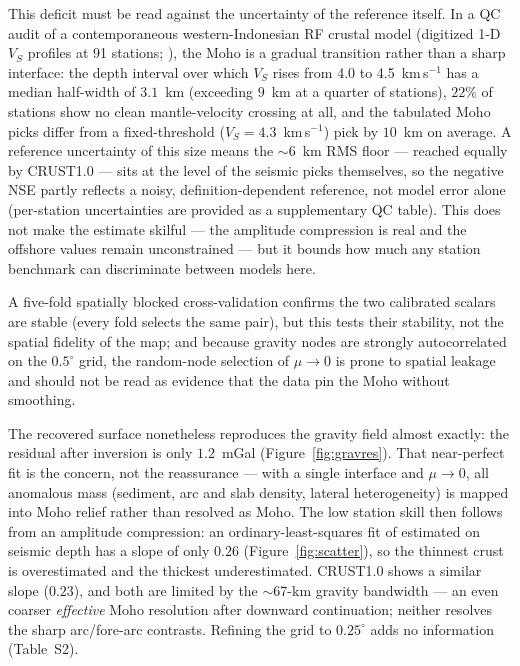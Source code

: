 \documentclass{agujournal2019}
\begin{document}
This deficit must be read against the uncertainty of the reference itself. In a QC
audit of a contemporaneous western-Indonesian RF crustal model (digitized 1-D $V_S$
profiles at 91 stations; \citealt{bahri2021}), the Moho is a gradual transition
rather than a sharp interface: the depth interval over which $V_S$ rises from 4.0 to
4.5~km\,s$^{-1}$ has a median half-width of $3.1$~km (exceeding $9$~km at a quarter of
stations), $22\%$ of stations show no clean mantle-velocity crossing at all, and the
tabulated Moho picks differ from a fixed-threshold ($V_S=4.3$~km\,s$^{-1}$) pick by
$10$~km on average. A reference uncertainty of this size means the $\sim$6~km RMS
floor --- reached equally by CRUST1.0 --- sits at the level of the seismic picks
themselves, so the negative NSE partly reflects a noisy, definition-dependent
reference, not model error alone (per-station uncertainties are provided as a
supplementary QC table). This does not make the estimate skilful --- the amplitude
compression is real and the offshore values remain unconstrained --- but it bounds
how much any station benchmark can discriminate between models here.

A five-fold spatially blocked cross-validation confirms the two
calibrated scalars are stable (every fold selects the same pair), but this tests
their stability, not the spatial fidelity of the map; and because gravity nodes are
strongly autocorrelated on the $0.5^{\circ}$ grid, the random-node selection of
$\mu\to0$ is prone to spatial leakage and should not be read as evidence that the
data pin the Moho without smoothing.

The recovered surface nonetheless reproduces the gravity field almost exactly: the
residual after inversion is only $1.2$~mGal (Figure~\ref{fig:gravres}). That
near-perfect fit is the concern, not the reassurance --- with a single interface and
$\mu\to0$, all anomalous mass (sediment, arc and slab density, lateral
heterogeneity) is mapped into Moho relief rather than resolved as Moho. The low
station skill then follows from an amplitude compression: an ordinary-least-squares
fit of estimated on seismic depth has a slope of only $0.26$
(Figure~\ref{fig:scatter}), so the thinnest crust is overestimated and the thickest
underestimated. CRUST1.0 shows a similar slope ($0.23$), and both are limited by the
$\sim$67-km gravity bandwidth --- an even coarser \emph{effective} Moho resolution
after downward continuation; neither resolves the sharp arc/fore-arc contrasts.
Refining the grid to $0.25^{\circ}$ adds no information (Table~S2).
\end{document}
